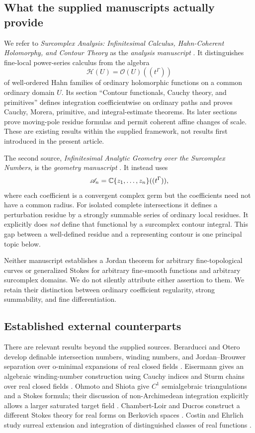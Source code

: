 \documentclass[11pt,letterpaper]{article}
\theoremstyle{definition}
\theoremstyle{remark}
\newcommand{\HH}{\mathcal H}\newcommand{\A}{\mathscr A}\newcommand{\OO}{\mathcal O}
\numberwithin{equation}{section}
\begin{document}
\subsection{What the supplied manuscripts actually provide}
We refer to \emph{Surcomplex Analysis: Infinitesimal Calculus, Hahn-Coherent Holomorphy, and Contour Theory} as the \emph{analysis manuscript} \cite{Analysis}. It distinguishes fine-local power-series calculus from the algebra
\[
 \HH(U)=\OO(U)((t^\Gamma))
\]
of well-ordered Hahn families of ordinary holomorphic functions on a common ordinary domain $U$. Its section ``Contour functionals, Cauchy theory, and primitives'' defines integration coefficientwise on ordinary paths and proves Cauchy, Morera, primitive, and integral-estimate theorems. Its later sections prove moving-pole residue formulas and permit coherent affine changes of scale. These are existing results within the supplied framework, not results first introduced in the present article.

The second source, \emph{Infinitesimal Analytic Geometry over the Surcomplex Numbers}, is the \emph{geometry manuscript} \cite{Geometry}. It instead uses
\[
 \A_n=\C\{z_1,\ldots,z_n\}((t^\Gamma)),
\]
where each coefficient is a convergent complex germ but the coefficients need not have a common radius. For isolated complete intersections it defines a perturbation residue by a strongly summable series of ordinary local residues. It explicitly does \emph{not} define that functional by a surcomplex contour integral. This gap between a well-defined residue and a representing contour is one principal topic below.

Neither manuscript establishes a Jordan theorem for arbitrary fine-topological curves or generalized Stokes for arbitrary fine-smooth functions and arbitrary surcomplex domains. We do not silently attribute either assertion to them. We retain their distinction between ordinary coefficient regularity, strong summability, and fine differentiation.

\subsection{Established external counterparts}
There are relevant results beyond the supplied sources. Berarducci and Otero develop definable intersection numbers, winding numbers, and Jordan--Brouwer separation over o-minimal expansions of real closed fields \cite{BOintersection}. Eisermann gives an algebraic winding-number construction using Cauchy indices and Sturm chains over real closed fields \cite{Eisermann}. Ohmoto and Shiota give $C^1$ semialgebraic triangulations and a Stokes formula; their discussion of non-Archimedean integration explicitly allows a larger saturated target field \cite{OS}. Chambert-Loir and Ducros construct a different Stokes theory for real forms on Berkovich spaces \cite{CLD}. Costin and Ehrlich study surreal extension and integration of distinguished classes of real functions \cite{CE}.
\end{document}
